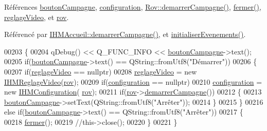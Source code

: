 Références \hyperlink{ihmrov_8h_source_l00057}{bouton\+Campagne}, \hyperlink{ihmrov_8h_source_l00049}{configuration}, \hyperlink{rov_8cpp_source_l00123}{Rov\+::demarrer\+Campagne()}, \hyperlink{ihmrov_8cpp_source_l00253}{fermer()}, \hyperlink{ihmrov_8h_source_l00048}{reglage\+Video}, et \hyperlink{ihmrov_8h_source_l00047}{rov}.



Référencé par \hyperlink{ihmaccueil_8cpp_source_l00323}{I\+H\+M\+Accueil\+::demarrer\+Campagne()}, et \hyperlink{ihmrov_8cpp_source_l00098}{initialiser\+Evenements()}.


\begin{DoxyCode}
00203 \{    
00204     qDebug() << Q\_FUNC\_INFO << \hyperlink{class_i_h_m_rov_a324be23537f48127c49b943aa439a978}{boutonCampagne}->text();
00205     \textcolor{keywordflow}{if}(\hyperlink{class_i_h_m_rov_a324be23537f48127c49b943aa439a978}{boutonCampagne}->text() == QString::fromUtf8(\textcolor{stringliteral}{"Démarrer"}))
00206     \{
00207         \textcolor{keywordflow}{if}(\hyperlink{class_i_h_m_rov_a6baa53853d29151404e6ae3dec5d2003}{reglageVideo} == \textcolor{keyword}{nullptr})
00208             \hyperlink{class_i_h_m_rov_a6baa53853d29151404e6ae3dec5d2003}{reglageVideo} = \textcolor{keyword}{new} \hyperlink{class_i_h_m_reglage_video}{IHMReglageVideo}(\hyperlink{class_i_h_m_rov_a777ca33fdb295ba6b6773e880356fa1e}{rov});
00209         \textcolor{keywordflow}{if}(\hyperlink{class_i_h_m_rov_a29f4de081899d8830376f1ad27e74647}{configuration} == \textcolor{keyword}{nullptr})
00210             \hyperlink{class_i_h_m_rov_a29f4de081899d8830376f1ad27e74647}{configuration} = \textcolor{keyword}{new} \hyperlink{class_i_h_m_configuration}{IHMConfiguration}(
      \hyperlink{class_i_h_m_rov_a777ca33fdb295ba6b6773e880356fa1e}{rov});
00211         \textcolor{keywordflow}{if}(\hyperlink{class_i_h_m_rov_a777ca33fdb295ba6b6773e880356fa1e}{rov}->\hyperlink{class_rov_ab20c6d0a73d6b20d4bef9e9236535a3d}{demarrerCampagne}())
00212         \{            
00213             \hyperlink{class_i_h_m_rov_a324be23537f48127c49b943aa439a978}{boutonCampagne}->setText(QString::fromUtf8(\textcolor{stringliteral}{"Arrêter"}));
00214         \}
00215     \}
00216     \textcolor{keywordflow}{else} \textcolor{keywordflow}{if}(\hyperlink{class_i_h_m_rov_a324be23537f48127c49b943aa439a978}{boutonCampagne}->text() == QString::fromUtf8(\textcolor{stringliteral}{"Arrêter"}))
00217     \{        
00218         \hyperlink{class_i_h_m_rov_ac0c8c09dc2ef1c06e1008647dcd2d6b8}{fermer}();
00219         \textcolor{comment}{//this->close();}
00220     \}
00221 \}
\end{DoxyCode}
\mbox{\label{class_i_h_m_rov_ab3e8686eef9233b4c1e6711cf1c4576a}} 
